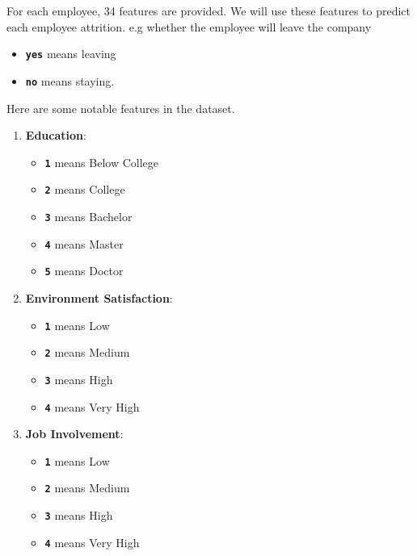 \documentclass[12pt, a4paper]{article}
\begin{document}
            For each employee, 34 features are provided. We will use these features to predict each employee attrition. e.g whether the employee will leave the company
            \begin{itemize}
                \item \textbf{\texttt{yes}} means leaving
                \item \textbf{\texttt{no}} means staying.
            \end{itemize}

            \noindent Here are some notable features in the dataset.
            
            \begin{enumerate}
                \item \textbf{Education}:
                \begin{itemize}
                    \item \textbf{\texttt{1}} means Below College
                    \item \textbf{\texttt{2}} means College
                    \item \textbf{\texttt{3}} means Bachelor
                    \item \textbf{\texttt{4}} means Master
                    \item \textbf{\texttt{5}} means Doctor
                \end{itemize}

                \item \textbf{Environment Satisfaction}:
                \begin{itemize}
                    \item \textbf{\texttt{1}} means Low
                    \item \textbf{\texttt{2}} means Medium
                    \item \textbf{\texttt{3}} means High
                    \item \textbf{\texttt{4}} means Very High
                \end{itemize}

                \item \textbf{Job Involvement}:
                \begin{itemize}
                    \item \textbf{\texttt{1}} means Low
                    \item \textbf{\texttt{2}} means Medium
                    \item \textbf{\texttt{3}} means High
                    \item \textbf{\texttt{4}} means Very High
                \end{itemize}


\end{enumerate}
\end{document}
